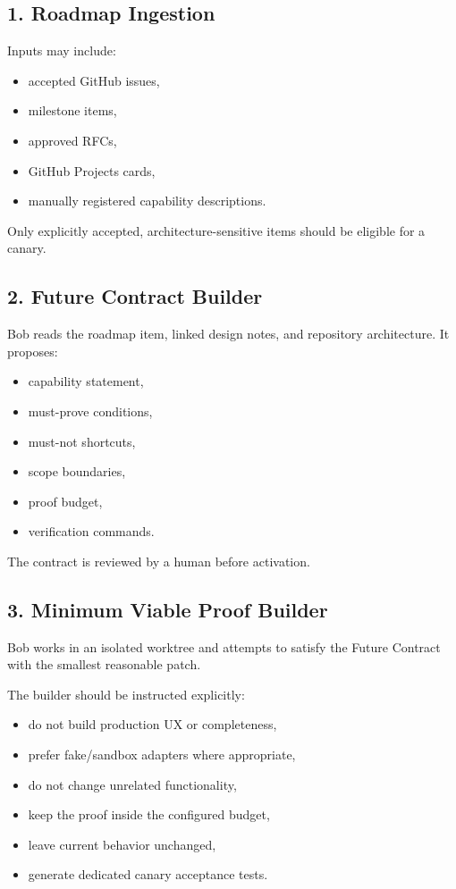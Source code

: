 \documentclass[12pt]{article}
\begin{document}
\subsection{1. Roadmap Ingestion}

Inputs may include:

\begin{itemize}
    \item accepted GitHub issues,
    \item milestone items,
    \item approved RFCs,
    \item GitHub Projects cards,
    \item manually registered capability descriptions.
\end{itemize}

Only explicitly accepted, architecture-sensitive items should be eligible for a canary.

\subsection{2. Future Contract Builder}

Bob reads the roadmap item, linked design notes, and repository architecture. It proposes:

\begin{itemize}
    \item capability statement,
    \item must-prove conditions,
    \item must-not shortcuts,
    \item scope boundaries,
    \item proof budget,
    \item verification commands.
\end{itemize}

The contract is reviewed by a human before activation.

\subsection{3. Minimum Viable Proof Builder}

Bob works in an isolated worktree and attempts to satisfy the Future Contract with the smallest reasonable patch.

The builder should be instructed explicitly:

\begin{itemize}
    \item do not build production UX or completeness,
    \item prefer fake/sandbox adapters where appropriate,
    \item do not change unrelated functionality,
    \item keep the proof inside the configured budget,
    \item leave current behavior unchanged,
    \item generate dedicated canary acceptance tests.
\end{itemize}
\end{document}
